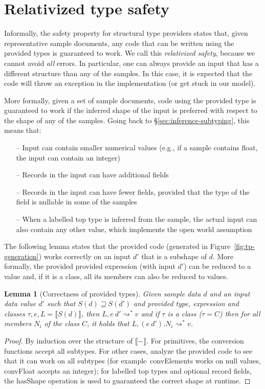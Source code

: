 \documentclass[10pt,preprint,clearpagebib]{sigplanconf}
\newcommand{\kvd}[1]{\textnormal{\textcolor{kvdclr}{\sffamily #1}}}
\newcommand{\ident}[1]{\textnormal{\sffamily #1}}
\newcommand{\reduce}{\rightsquigarrow}
\newcommand{\sem}[1]{\llbracket #1 \rrbracket}
\newcommand{\semalt}[1]{S(#1)}
\newtheorem{lemma}[theorem]{Lemma}
\begin{document}
\section{Relativized type safety}
\label{sec:safety}

Informally, the safety property for structural type providers states that, given representative sample
documents, any code that can be written using the provided types is guaranteed to work. We call this 
\emph{relativized safety}, because we cannot avoid \emph{all} errors. In particular, one can always
provide an input that has a different structure than any of the samples. In this case, it is expected 
that the code will throw an exception in the implementation (or get stuck in our model).

More formally, given a set of sample documents, code using the provided type is guaranteed to work if 
the inferred shape of the input is preferred with respect to the shape of any of the samples. Going back to 
\S\ref{sec:inference-subtyping}, this means that:
%
\begin{itemize}
\item[--] Input can contain smaller numerical values (e.g., if a sample contains float, the input can contain an integer)
\item[--] Records in the input can have additional fields
\item[--] Records in the input can have fewer fields, provided that the type of the field is nullable in some of the samples
\item[--] When a labelled top type is inferred from the sample, the actual input can also contain any other value,
  which implements the open world assumption  
\end{itemize}
%
The following lemma states that the provided code (generated in Figure~\ref{fig:tp-generation})
works correctly on an input $d'$ that is a subshape of $d$. More formally, the provided
provided expression (with input $d'$) can be reduced to a value and, if it is a class,
all its members can also be reduced to values.

\begin{lemma}[Correctness of provided types]
\label{thm:tp-correctness}
Given sample data $d$ and an input data value $d'$ such that $\semalt{d} \sqsupseteq \semalt{d'}$
and provided type, expression and classes $\tau, e, L = \sem{\semalt{d}}$, 
then $L, e~d' \reduce^{*} v$ and if $\tau$ is a class ($\tau=C$) then for all members $N_i$ of the 
class $C$, it holds that $L, (e~d').N_i \reduce^{*} v$.
\end{lemma}
\begin{proof}
By induction over the structure of $\sem{-}$. For primitives, the conversion functions accept all subtypes.
For other cases, analyze the provided code to see that it can work on all subtypes (for example~\ident{convElements}
works on \kvd{null} values, \ident{convFloat} accepts an integer); for labelled top types and
optional record fields, the \ident{hasShape} operation is used to guaranteed the correct shape at runtime.
\end{proof}
\end{document}
